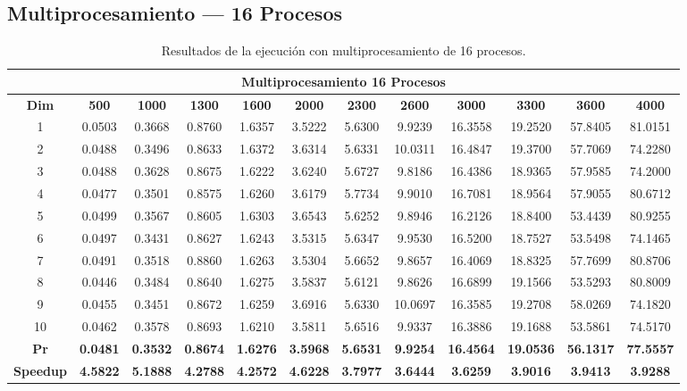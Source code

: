 \documentclass{article}
\begin{document}

\subsection{Multiprocesamiento --- 16 Procesos}

\begin{table}[H]
\centering
\tiny
\begin{tabular}{|c|c|c|c|c|c|c|c|c|c|c|c|}
\hline
\multicolumn{12}{|c|}{\textbf{Multiprocesamiento 16 Procesos}} \\
\hline
\textbf{Dim} & \textbf{500} & \textbf{1000} & \textbf{1300} & \textbf{1600} & \textbf{2000} & \textbf{2300} & \textbf{2600} & \textbf{3000} & \textbf{3300} & \textbf{3600} & \textbf{4000} \\
\hline
1  & 0.0503 & 0.3668 & 0.8760 & 1.6357 & 3.5222 & 5.6300 & 9.9239 & 16.3558 & 19.2520 & 57.8405 & 81.0151 \\
2  & 0.0488 & 0.3496 & 0.8633 & 1.6372 & 3.6314 & 5.6331 & 10.0311 & 16.4847 & 19.3700 & 57.7069 & 74.2280 \\
3  & 0.0488 & 0.3628 & 0.8675 & 1.6222 & 3.6240 & 5.6727 & 9.8186 & 16.4386 & 18.9365 & 57.9585 & 74.2000 \\
4  & 0.0477 & 0.3501 & 0.8575 & 1.6260 & 3.6179 & 5.7734 & 9.9010 & 16.7081 & 18.9564 & 57.9055 & 80.6712 \\
5  & 0.0499 & 0.3567 & 0.8605 & 1.6303 & 3.6543 & 5.6252 & 9.8946 & 16.2126 & 18.8400 & 53.4439 & 80.9255 \\
6  & 0.0497 & 0.3431 & 0.8627 & 1.6243 & 3.5315 & 5.6347 & 9.9530 & 16.5200 & 18.7527 & 53.5498 & 74.1465 \\
7  & 0.0491 & 0.3518 & 0.8860 & 1.6263 & 3.5304 & 5.6652 & 9.8657 & 16.4069 & 18.8325 & 57.7699 & 80.8706 \\
8  & 0.0446 & 0.3484 & 0.8640 & 1.6275 & 3.5837 & 5.6121 & 9.8626 & 16.6899 & 19.1566 & 53.5293 & 80.8009 \\
9  & 0.0455 & 0.3451 & 0.8672 & 1.6259 & 3.6916 & 5.6330 & 10.0697 & 16.3585 & 19.2708 & 58.0269 & 74.1820 \\
10 & 0.0462 & 0.3578 & 0.8693 & 1.6210 & 3.5811 & 5.6516 & 9.9337 & 16.3886 & 19.1688 & 53.5861 & 74.5170 \\
\hline
\textbf{Pr} & \textbf{0.0481} & \textbf{0.3532} & \textbf{0.8674} & \textbf{1.6276} & \textbf{3.5968} & \textbf{5.6531} & \textbf{9.9254} & \textbf{16.4564} & \textbf{19.0536} & \textbf{56.1317} & \textbf{77.5557} \\
\hline
\textbf{Speedup} & \textbf{4.5822} & \textbf{5.1888} & \textbf{4.2788} & \textbf{4.2572} & \textbf{4.6228} & \textbf{3.7977} & \textbf{3.6444} & \textbf{3.6259} & \textbf{3.9016} & \textbf{3.9413} & \textbf{3.9288} \\
\hline
\end{tabular}
\caption{Resultados de la ejecución con multiprocesamiento de 16 procesos.}
\label{tab:mp16}
\end{table}
\end{document}
